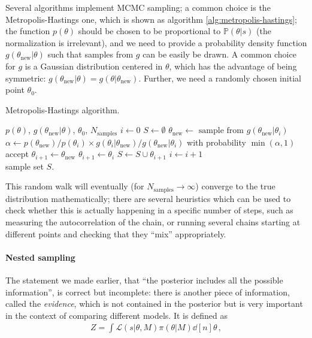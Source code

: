 \documentclass[main.tex]{subfiles}
\begin{document}
Several algorithms implement \ac{MCMC} sampling; a common choice is the Metropolis-Hastings one, which is shown as algorithm \ref{alg:metropolis-hastings}; the function \(p(\theta )\) should be chosen to be proportional to \(\mathbb{P}(\theta | s)\) (the normalization is irrelevant), and we need to provide a probability density function \(g(\theta _{\text{new}}  | \theta  )\) such that samples from \(g\) can be easily be drawn. A common choice for \(g\) is a Gaussian distribution centered in \(\theta \), which has the advantage of being symmetric: \(g( \theta _{\text{new}}| \theta ) = g (\theta | \theta _{\text{new}})\).
Further, we need a randomly chosen initial point \(\theta_0 \).

\begin{algorithm}
\caption{Metropolis-Hastings algorithm. }\label{alg:metropolis-hastings}
\begin{algorithmic}
\Require $p(\theta )$, \(g(\theta _{\text{new}} | \theta  )\), \(\theta_0 \), \(N _{\text{samples}}\)
\State $i \gets 0$
\State $S \gets \emptyset$ 
\State \(\theta _{\text{new}} \gets \text{ sample from } g(\theta _{\text{new}} | \theta_{i})\)
\State \(\alpha \gets p(\theta _{\text{new}}) / p(\theta_i) \times g(\theta _i | \theta _{\text{new}}) / g(\theta _{\text{new}} | \theta_i)\) 
\State with probability \(\min(\alpha, 1) \) accept
    \State $\theta_{i+1} \gets \theta  _{\text{new}}$
\Else
    \State $\theta _{i+1} \gets \theta _i$
\EndIf
\State \(S \gets S \cup \theta_{i+1}\)
\State \(i \gets i+1\)
\EndWhile \\
\Return sample set \(S\). 
\end{algorithmic}
\end{algorithm}

This random walk will eventually (for \(N _{\text{samples}} \to \infty \)) converge to the true distribution mathematically; there are several heuristics which can be used to check whether this is actually happening in a specific number of steps, such as measuring the autocorrelation of the chain, or running several chains starting at different points and checking that they ``mix'' appropriately. 

\paragraph{Nested sampling}

The statement we made earlier, that ``the posterior includes all the possible information'', is correct but incomplete: there is another piece of information, called the \emph{evidence}, which is not contained in the posterior but is very important in the context of comparing different models. It is defined as 
%
\begin{align}
Z = \int \mathscr{L}(s | \theta , M) \pi (\theta | M) \dd[n]{\theta }
\,,
\end{align}
%
\end{document}
